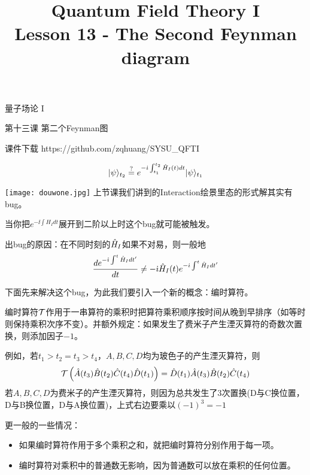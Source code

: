 \documentclass[CJK]{beamer}
\title{Quantum Field Theory I \\ Lesson 13 - The Second Feynman diagram}
\author{}
\date{}
\begin{document}
\begin{frame}
 
\begin{center}
\begin{Large}
\bch
量子场论 I 

{\vskip 0.3in}

第十三课 第二个Feynman图

\ech
\end{Large}
\end{center}

\vskip 0.2in

\bch
课件下载
\ech
https://github.com/zqhuang/SYSU\_QFTI

\end{frame}

\begin{frame}
\bch

$$|\psi\rangle_{t_2} \stackrel{?}{=} e^{-{\dot{\imath}}\int_{t_1}^{t_2} {\hat{H}}_I(t) dt} |\psi\rangle_{t_1}$$

\texttt{[image: douwone.jpg]}
\emini
{}
上节课我们讲到的Interaction绘景里态的形式解其实有bug。

当你把$e^{-\ii\int H_Idt}$展开到二阶以上时这个bug就可能被触发。

\emini


\skipline
{\small
出bug的原因：在不同时刻的${\hat{H}}_I$如果不对易，则一般地$$\frac{d e^{-{\dot{\imath}}\int^t {\hat{H}}_I dt'}}{dt} \ne -{\dot{\imath}} {\hat{H}}_I(t) e^{-{\dot{\imath}}\int^t {\hat{H}}_I dt'}$$
\skipline

下面先来解决这个bug，为此我们要引入一个新的概念：编时算符。
}
\ech
\end{frame}

\begin{frame}
\bch
{\small
编时算符${\mathcal{T}}$作用于一串算符的乘积时把算符乘积顺序按时间从晚到早排序（如等时则保持乘积次序不变）。并额外规定：如果发生了费米子产生湮灭算符的奇数次置换，则添加因子$-1$。

例如，若$t_1>t_2 = t_3>t_4$，$A,B,C,D$均为玻色子的产生湮灭算符，则
$$\mathcal{T}\left(\hat{A}(t_3)\hat{B}(t_2)\hat{C}(t_4)\hat{D}(t_1)\right) = \hat{D}(t_1)\hat{A}(t_3)\hat{B}(t_2)\hat{C}(t_4)$$
若$A, B, C, D$为费米子的产生湮灭算符，则因为总共发生了3次置换(D与C换位置，D与B换位置，D与A换位置)，上式右边要乘以$(-1)^3 = -1$
}
\skipline
{\scriptsize
更一般的一些情况：
\begin{itemize}
\item{如果编时算符作用于多个乘积之和，就把编时算符分别作用于每一项。}
\item{编时算符对乘积中的普通数无影响，因为普通数可以放在乘积的任何位置。}
\end{itemize}
}
\ech
\end{frame}
\end{document}

